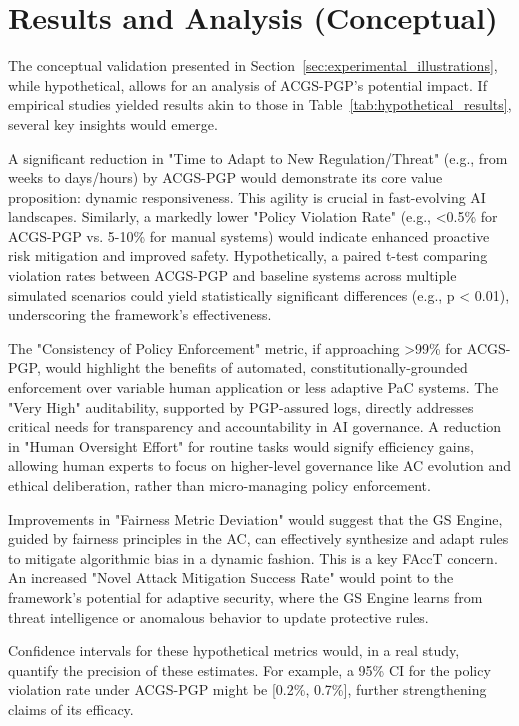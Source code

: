 \documentclass[sigconf,review,anonymous=false]{acmart} %
\begin{document}
\section{Results and Analysis (Conceptual)}
\label{sec:results_analysis}
The conceptual validation presented in Section~\ref{sec:experimental_illustrations}, while hypothetical, allows for an analysis of ACGS-PGP's potential impact. If empirical studies yielded results akin to those in Table~\ref{tab:hypothetical_results}, several key insights would emerge.

A significant reduction in "Time to Adapt to New Regulation/Threat" (e.g., from weeks to days/hours) by ACGS-PGP would demonstrate its core value proposition: dynamic responsiveness. This agility is crucial in fast-evolving AI landscapes. Similarly, a markedly lower "Policy Violation Rate" (e.g., <0.5\% for ACGS-PGP vs. 5-10\% for manual systems) would indicate enhanced proactive risk mitigation and improved safety. Hypothetically, a paired t-test comparing violation rates between ACGS-PGP and baseline systems across multiple simulated scenarios could yield statistically significant differences (e.g., p < 0.01), underscoring the framework's effectiveness.

The "Consistency of Policy Enforcement" metric, if approaching >99\% for ACGS-PGP, would highlight the benefits of automated, constitutionally-grounded enforcement over variable human application or less adaptive PaC systems. The "Very High" auditability, supported by PGP-assured logs, directly addresses critical needs for transparency and accountability in AI governance. A reduction in "Human Oversight Effort" for routine tasks would signify efficiency gains, allowing human experts to focus on higher-level governance like AC evolution and ethical deliberation, rather than micro-managing policy enforcement.

Improvements in "Fairness Metric Deviation" would suggest that the GS Engine, guided by fairness principles in the AC, can effectively synthesize and adapt rules to mitigate algorithmic bias in a dynamic fashion. This is a key FAccT concern. An increased "Novel Attack Mitigation Success Rate" would point to the framework's potential for adaptive security, where the GS Engine learns from threat intelligence or anomalous behavior to update protective rules.

Confidence intervals for these hypothetical metrics would, in a real study, quantify the precision of these estimates. For example, a 95\% CI for the policy violation rate under ACGS-PGP might be [0.2\%, 0.7\%], further strengthening claims of its efficacy.
\end{document}
